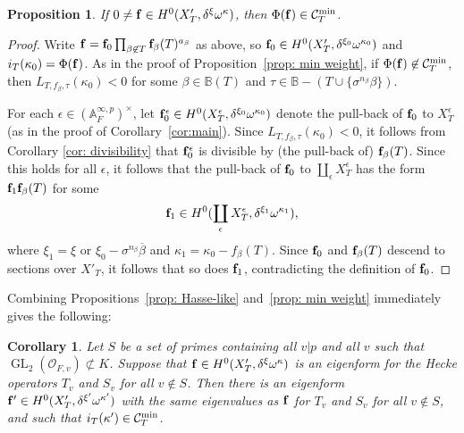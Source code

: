 \documentclass[11pt,pdflatex]{amsart}
\theoremstyle{plain}
\theoremstyle{definition}
\newcommand{\CO}{\mathcal{O}}
\theoremstyle{plain}
\newtheorem{prop}[theorem]{Proposition}
\newtheorem{cor}[theorem]{Corollary}
\theoremstyle{definition}
\theoremstyle{remark}
\numberwithin{equation}{section}
\numberwithin{figure}{section} \numberwithin{table}{subsection}
\newcommand{\GL}{{\operatorname{GL}}}
\newcommand{\calC}{{\mathcal{C}}}
\def\AA{\mathbb{A}}
\def\BB{\mathbb{B}}
\begin{document}
\begin{prop} \label{prop: min weight'} If $0 \neq {\bf f} \in H^0(X'_T,\delta^\xi\omega^\kappa)$, then $\Phi({\bf f}) \in \calC^{\rm min}_T$.
\end{prop}
 \begin{proof} Write ${\bf f}={\bf f}_0\prod_{\beta \not\in T} {\bf f}_\beta(T)^{a_\beta}$ as above, so ${\bf f}_0 \in H^0(X'_T,\delta^{\xi_0}\omega^{\kappa_0})$ and $i_T(\kappa_0)=\Phi({\bf f})$.  As in the proof of Proposition~\ref{prop: min weight}, if $\Phi({\bf f})\not \in \calC^{\rm min}_T$, then $L_{T,f_\beta,\tau}(\kappa_0)<0$ for some $\beta \in \BB(T)$ and  $\tau \in \BB-(T \cup\{\sigma^{n_\beta}\beta\})$.

For each $\epsilon \in (\AA_F^{\infty,p})^\times$, let ${\bf f}_0^\epsilon \in H^0(X^\epsilon_T, \delta^{\xi_0}\omega^{\kappa_0})$ denote the pull-back of ${\bf f}_0$ to $X_T^\epsilon$ (as in the proof of Corollary~\ref{cor:main}).  Since $L_{T,f_\beta,\tau}(\kappa_0)<0$, it follows from Corollary \ref{cor: divisibility} that ${\bf f}_0^\epsilon$ is divisible by (the pull-back of) ${\bf f}_\beta(T)$. Since this holds for all $\epsilon$, it follows that the pull-back of ${\bf f}_0$ to $\coprod_\epsilon X_T^\epsilon$ has the form ${\bf f}_1{\bf f}_\beta(T)$ for some 
$${\bf f}_1 \in H^0(\coprod_\epsilon X^\epsilon_T, \delta^{\xi_1}\omega^{\kappa_1}),$$
where $\xi_1 = \xi$ or $\xi_0 - \sigma^{n_\beta}\overline{\beta}$ and $\kappa_1 = \kappa_0 - f_\beta(T)$.  Since ${\bf f}_0$ and ${\bf f}_\beta(T)$ descend to sections over $X'_T$, it follows that so does ${\bf f}_1$, contradicting the definition of ${\bf f}_0$.
 \end{proof}

Combining Propositions~\ref{prop: Hasse-like} and~\ref{prop: min weight} immediately gives the following:
\begin{cor} Let $S$ be a set of primes containing all $v|p$ and all $v$ such that $\GL_2(\CO_{F,v}) \not\subset K$.  Suppose that ${\bf f} \in H^0(X'_T,\delta^\xi\omega^\kappa)$ is an eigenform for the Hecke operators $T_v$ and $S_v$ for all $v \not\in S$. Then there is an eigenform ${\bf f}' \in H^0(X'_T,\delta^{\xi'}\omega^{\kappa'})$ with the same eigenvalues as ${\bf f}$ for $T_v$ and $S_v$ for all $v\not\in S$, and such that
$i_T(\kappa') \in \calC^{\rm min}_T$.
\end{cor}
\end{document}
